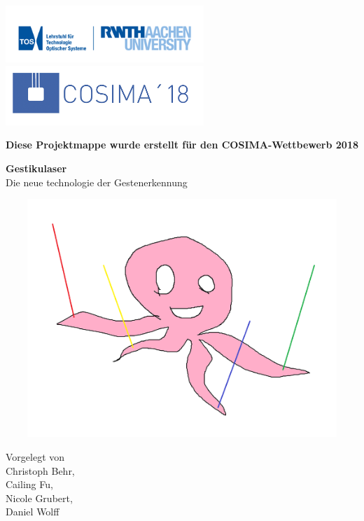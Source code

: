 
\begin{titlepage}
	\small
	\vspace*{4mm}%
	\parindent0pt%
	\includegraphics[width=7.5cm]{figures/TOSLogo.png}
	\includegraphics[width=7.5cm]{figures/COSIMALogo.png}
	\begin{center}
		\bfseries Diese Projektmappe wurde erstellt für den COSIMA-Wettbewerb 2018
	\end{center}
	\vspace*{15mm}
	\normalsize	
	\begin{center}
		\huge
		{\bfseries\sffamily Gestikulaser}
		\\
		\large
		Die neue technologie der Gestenerkennung
	\end{center}
	\vfill
	\begin{center}
	\large \mydate{\today}
	\end{center}
	\includegraphics[width=15cm,height=9cm]{figures/GestikulaserLogo.png}
	\vfill
	\begin{center}
		Vorgelegt von \\[3ex]
		Christoph Behr, \\
		Cailing Fu, \\
		Nicole Grubert, \\
		Daniel Wolff \\
	\end{center}
\end{titlepage}